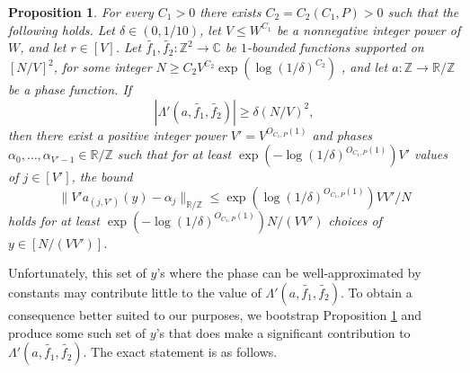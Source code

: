 \documentclass[11pt]{amsart}
\newtheorem{proposition}[lemma]{Proposition}
\theoremstyle{definition}
\newcommand{\R}{{\mathbb R}}
\newcommand{\Z}{{\mathbb Z}}
\begin{document}
\begin{proposition}\label{prop:popular-a-value}
 For every $C_1>0$ there exists $C_2=C_2(C_1,P)>0$ such that the following holds. Let $\delta\in(0, 1/10)$, let $V\leq W^{C_1}$ be a nonnegative integer power of $W$, and let $r\in[V]$.  Let $\widetilde{f_1},\widetilde{f_2}: \Z^2 \to \mathbb{C}$ be $1$-bounded functions supported on $[N/V]^2$, for some integer $N\geq C_2 V^{C_2}\exp(\log(1/\delta)^{C_2})$ , and let $a: \Z \to \mathbb{R}/\mathbb{Z}$ be a phase function.  If
$$|\Lambda'(a,\widetilde{f_1}, \widetilde{f_2})| \geq \delta (N/V)^{2},$$
then there exist a positive integer power $V' = V^{O_{C_1,P}(1)}$ 
and phases $\alpha_0, \ldots, \alpha_{V'-1}\in\R/\Z$ 
such that for at least $\exp(-\log(1/\delta)^{O_{C_1,P}(1)})V'$ values of $j \in[V']$, the bound
$$\|V'a_{(j, V')}(y) -\alpha_j\|_{\mathbb{R}/\mathbb{Z}} \leq \exp(\log(1/\delta)^{O_{C_1,P}(1)}) VV'/N$$
holds for at least $\exp(-\log(1/\delta)^{O_{C_1,P}(1)}) N/(VV')$  choices of $y \in [N/(VV')]$.
\end{proposition}

Unfortunately, this set of $y$'s where the phase can be well-approximated by constants may contribute little to the value of $\Lambda'(a,\widetilde{f_1}, \widetilde{f_2})$. To obtain a consequence better suited to our purposes, we bootstrap Proposition \ref{prop:popular-a-value} and produce some such set of $y$'s that does make a significant contribution to $\Lambda'(a, \widetilde{f_1}, \widetilde{f_2})$. The exact statement is as follows.
\end{document}
